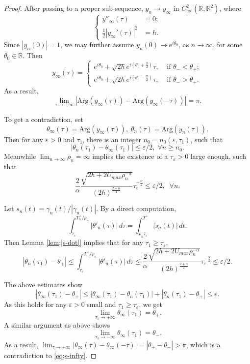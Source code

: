 \documentclass[10pt,a4paper]{amsart}
\newcommand{\al}{\alpha}
\newcommand{\ep}{\varepsilon}
\newcommand{\ey}{\frac{1}{2}}
\newcommand{\gm}{\gamma}
\newcommand{\rr}{\mathbb R}
\newcommand{\tht}{\theta}
\begin{document}
\begin{proof}
After passing to a proper sub-sequence, $y_n \to y_{\infty}$ in $C^2_{\text{loc}}(\rr, \rr^2)$, where 
$$ \begin{cases}
y''_{\infty}(\tau) & = 0; \\
\ey |y_{\infty}'(\tau)|^2 & = h. 
\end{cases}
$$
Since $|y_n(0)| = 1$, we may further assume $y_n(0) \to e^{i\tht_0}$, as $n \to \infty$, for some $\tht_0 \in \rr$. Then  
\begin{equation*}
\label{eq;y-infty}  y_{\infty}(\tau) =  \begin{cases}
e^{i \tht_0} + \sqrt{2h} e^{i(\tht_0 +\frac{\pi}{2})} \tau, & \text{ if } \tht_- < \tht_+; \\
 e^{i \tht_0} + \sqrt{2h} e^{i(\tht_0 - \frac{\pi}{2})} \tau, & \text{ if } \tht_- > \tht_+.  
\end{cases}   
\end{equation*}
As a result, 
\begin{equation}
\label{eq;s-infty} \lim_{\tau \to + \infty} |\text{Arg}(y_{\infty}(\tau)) - \text{Arg}(y_{\infty}(-\tau))| = \pi. 
\end{equation}

To get a contradiction, set 
$$ \tht_{\infty}(\tau)= \text{Arg}(y_{\infty}(\tau)), \; \tht_n(\tau)= \text{Arg}(y_n(\tau)). $$ 
Then for any $\ep>0$ and $\tau_1$, there is an integer $n_0= n_0(\ep, \tau_1)$, such that   
\begin{equation*}
|\tht_n(\tau_1)-\tht_{\infty}(\tau_1)| \le \ep/2, \; \forall n \ge n_0. 
\end{equation*}
Meanwhile $\lim_{n \to \infty} \rho_n = \infty$ implies the existence of a $\tau_{\ep}>0$ large enough, such that 
\begin{equation*}
\label{eq;tau-ep} \frac{2}{\al} \frac{\sqrt{2h + 2 U_{max} \rho_n^{-\al}}}{(2h)^{\frac{2+\al}{4}}} \tau_{\ep}^{-\frac{\al}{2}} \le \ep/2, \;\; \forall n. 
\end{equation*}

Let  $s_n(t) = \gm_n(t)/|\gm_n(t)|$. By a direct computation, 
$$ \int_{\tau_{\ep}}^{T_n^+/\rho_n} |\tht'_n(\tau)| \,d\tau = \int_{\rho_n \tau_{\ep}}^{T^+} |\dot{s}_n(t)| \,dt 
. $$
Then Lemma \ref{lem;|s-dot|} implies that for any $\tau_1 \ge \tau_{\ep}$,
$$ |\tht_n(\tau_1)-\tht_+| \le \int_{\tau_{\ep}}^{T_n^+/\rho_n} |\tht'_n(\tau)| \,d\tau \le \frac{2}{\al} \frac{\sqrt{2h + 2 U_{max} \rho_n^{-\al}}}{(2h)^{\frac{2+\al}{4}}} \tau_{\ep}^{-\frac{\al}{2}} \le \ep/2.
$$

The above estimates show
$$ |\tht_{\infty}(\tau_1) - \tht_+| \le |\tht_{\infty}(\tau_1) -\tht_n(\tau_1)| + |\tht_n(\tau_1)- \tht_+| \le \ep. $$
As this holds for any $\ep>0$ small and $\tau_1 \ge \tau_{\ep}$, we get  
$$ \lim_{\tau_1 \to +\infty} \tht_{\infty}(\tau_1)=\tht_+. $$
A similar argument as above shows 
$$ \lim_{\tau_1 \to -\infty} \tht_{\infty}(\tau_1)=\tht_-. $$
As a result, $\lim_{\tau \to +\infty}|\tht_{\infty}(\tau) - \tht_{\infty}(-\tau)| = |\tht_+ -\tht_-| >\pi$, which is a contradiction to \eqref{eq;s-infty}.

\end{proof}
\end{document}

